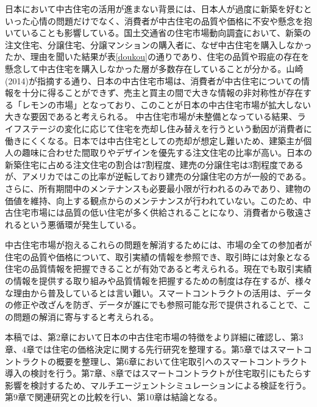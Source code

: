 \documentclass[a4paper,fontsize=11pt,report,notitlepage,line_length=38zw,number_of_lines=40]{jlreq}
\begin{document}
日本において中古住宅の活用が進まない背景には、日本人が過度に新築を好むといった心情の問題だけでなく、消費者が中古住宅の品質や価格に不安や懸念を抱いていることも影響している。国土交通省の住宅市場動向調査において、新築の注文住宅、分譲住宅、分譲マンションの購入者に、なぜ中古住宅を購入しなかったか、理由を聞いた結果が表\ref{doukou}の通りであり、住宅の品質や瑕疵の存在を懸念して中古住宅を購入しなかった層が多数存在していることが分かる。山崎(2014)\cite{yamasaki2014}が指摘する通り、日本の中古住宅市場は、消費者が中古住宅についての情報を十分に得ることができず、売主と買主の間で大きな情報の非対称性が存在する「レモンの市場」となっており、このことが日本の中古住宅市場が拡大しない大きな要因であると考えられる。
中古住宅市場が未整備となっている結果、ライフステージの変化に応じて住宅を売却し住み替えを行うという動因が消費者に働きにくくなる。日本では中古住宅としての売却が想定し難いため、建築主が個人の趣味に合わせた間取りやデザインを優先する注文住宅の比率が高い。日本の新築住宅に占める注文住宅の割合は7割程度、建売の分譲住宅は3割程度であるが、アメリカではこの比率が逆転しており建売の分譲住宅の方が一般的である。さらに、所有期間中のメンテナンスも必要最小限が行われるのみであり、建物の価値を維持、向上する観点からのメンテナンスが行われていない。このため、中古住宅市場には品質の低い住宅が多く供給されることになり、消費者から敬遠されるという悪循環が発生している。

中古住宅市場が抱えるこれらの問題を解消するためには、市場の全ての参加者が住宅の品質や価格について、取引実績の情報を参照でき、取引時には対象となる住宅の品質情報を把握できることが有効であると考えられる。現在でも取引実績の情報を提供する取り組みや品質情報を把握するための制度は存在するが、様々な理由から普及しているとは言い難い。スマートコントラクトの活用は、データの修正や改ざんを防ぎ、データが誰にでも参照可能な形で提供されることで、この問題の解消に寄与すると考えられる。

本稿では、第2章において日本の中古住宅市場の特徴をより詳細に確認し、第3章、4章では住宅の価格決定に関する先行研究を整理する。第5章ではスマートコントラクトの概要を整理し、第6章において住宅取引へのスマートコントラクト導入の検討を行う。第7章、8章ではスマートコントラクトが住宅取引にもたらす影響を検討するため、マルチエージェントシミュレーションによる検証を行う。第9章で関連研究との比較を行い、第10章は結論となる。
\end{document}
